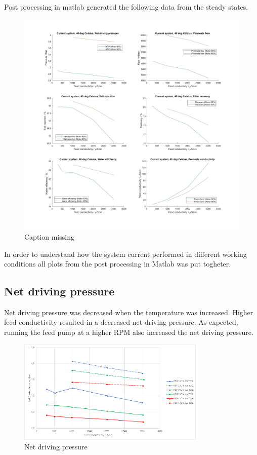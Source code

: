 \newpage

Post processing in matlab generated the following data from the steady states.

\begin{figure}[H]
    \centering
    \includegraphics[width=1.1\textwidth]{Key40}
    \caption{Caption missing}
    \label{fig:PressConn}
\end{figure}

\newpage

In order to understand how the system current performed in different working conditions all plots from the post processing in Matlab was put togheter. 

\subsection{Net driving pressure}

Net driving pressure was decreased when the temperature was increased. Higher feed conductivity resulted in a decreased net driving pressure. As expected, running the feed pump at a higher RPM also increased the net driving pressure.

\begin{figure}[H]
    \centering
    \includegraphics[width=0.8\textwidth]{NDP}
    \caption{Net driving pressure}
    \label{fig:NDP}
\end{figure}

